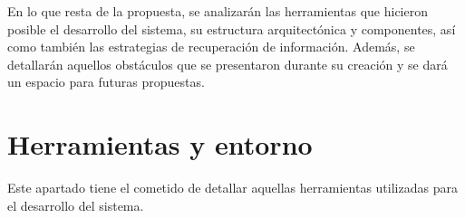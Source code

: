 \documentclass[12pt]{article} %
\begin{document}
En lo que resta de la propuesta, se analizarán las herramientas que hicieron posible el desarrollo del sistema, su estructura arquitectónica y componentes, así como también las estrategias de recuperación de información. Además, se detallarán aquellos obstáculos que se presentaron durante su creación y se dará un espacio para futuras propuestas. 



\section{Herramientas y entorno} 
Este apartado tiene el cometido de detallar aquellas herramientas utilizadas para el desarrollo del sistema.
\end{document}
